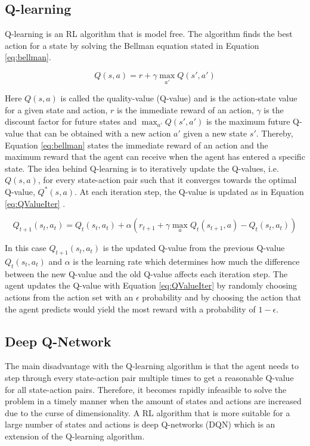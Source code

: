 \subsection{Q-learning}
\noindent  Q-learning is an RL algorithm that is model free. The algorithm finds the best action for a state by solving the Bellman equation stated in Equation \ref{eq:bellman}.

\begin{equation}
\label{eq:bellman}
    Q(s,a) = r + \gamma \max_{a'} Q(s',a')
\end{equation}

\noindent Here $Q(s,a)$ is called the quality-value (Q-value) and is the action-state value for a given state and action, $r$ is the immediate reward of an action, $\gamma$ is the discount factor for future states and $\max_{a'} Q(s',a')$ is the maximum future Q-value that can be obtained with a new action $a'$ given a new state $s'$. Thereby, Equation \ref{eq:bellman} states the immediate reward of an action and the maximum reward that the agent can receive when the agent has entered a specific state. The idea behind Q-learning is to iteratively update the Q-values, i.e. $Q(s,a)$, for every state-action pair such that it converges towards the optimal Q-value, $Q^*(s,a)$. At each iteration step, the Q-value is updated as in Equation \ref{eq:QValueIter} \cite{sutton2018reinforcement}.

\begin{equation}
\label{eq:QValueIter}
    Q_{t+1}(s_t,a_t)=Q_{t}(s_t,a_t)+\alpha(r_{t+1} + \gamma \max_{a} Q_t(s_{t+1},a)-Q_{t}(s_t,a_t))
\end{equation}

\noindent In this case $Q_{t+1}(s_t,a_t)$ is the updated Q-value from the previous Q-value $Q_{t}(s_t,a_t)$ and $\alpha$ is the learning rate which determines how much the difference between the new Q-value and the old Q-value affects each iteration step. The agent updates the Q-value with Equation \ref{eq:QValueIter} by randomly choosing actions from the action set with an $\epsilon$ probability and by choosing the action that the agent predicts would yield the most reward with a probability of $1-\epsilon$.

\subsection{Deep Q-Network}

The main disadvantage with the Q-learning algorithm is that the agent needs to step through every state-action pair multiple times to get a reasonable Q-value for all state-action pairs. Therefore, it becomes rapidly infeasible to solve the problem in a timely manner when the amount of states and actions are increased due to the curse of dimensionality. A RL algorithm that is more suitable for a large number of states and actions is deep Q-networks (DQN) which is an extension of the Q-learning algorithm.\newline


